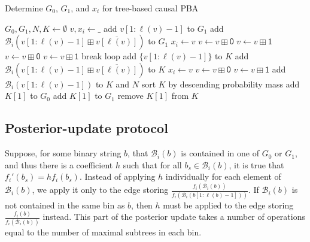 \documentclass{IEEEtran}
\begin{document}
\begin{algorithm}
\caption{Determine $G_0$, $G_1$, and $x_i$ for tree-based causal PBA}
\label{alg:treeg0}
\begin{algorithmic}
\STATE $G_0, G_1,N, K \gets \emptyset $
\STATE $v,x_i \gets \mathsf{\_}$ 
	\STATE add $v[1:\ell(v)-1]$ to $G_1$
	\STATE add
	$\mathcal{B}_i(v[1:\ell(v)-1]\boxplus \overline{v[\ell(v)]})$ to $G_1$
	\STATE $x_i \gets v$
	\ENDIF
	\STATE $v \gets v\boxplus \mathsf{0}$
	\STATE $v \gets v\boxplus\mathsf{1}$
	\ELSE
	\STATE $v \gets v \boxplus\mathsf{0}$
	\ELSE
	\STATE $v \gets v\boxplus\mathsf{1}$
	\ENDIF
	\STATE break loop
	\ENDIF
\ENDWHILE
{}
\STATE add $\{v[1:\ell(v)-1]\}$ to $K$
\STATE add
$\mathcal{B}_i(v[1:\ell(v)-1]\boxplus \overline{v[\ell(v)]})$ to $K$
\STATE $x_i\gets v$
\ENDIF
{}
\STATE $v \gets v\boxplus\mathsf{0}$
\ELSE
\STATE $v \gets v\boxplus\mathsf{1} $
\ENDIF
\ENDFOR
\STATE add $\mathcal{B}_i(v[1:\ell(v)-1])$ to $K$ and $N$
\STATE sort $K$ by descending probability mass
\STATE add $K[1]$ to $G_0$
\ELSE
\STATE add $K[1]$ to $G_1$
\ENDIF
\STATE remove $K[1]$ from $K$
\ENDWHILE
\end{algorithmic}
\end{algorithm}
\subsection{Posterior-update protocol}
\label{ssec:treeposterior}
Suppose, for some binary string $b$, that $\mathcal{B}_i(b)$ is contained
in one of $G_0$ or $G_1$, and thus there is a coefficient $h$ such that
for all $b_s \in \mathcal{B}_i(b)$, it is true that $f_i'(b_s)=hf_i(b_s)$.
Instead of applying $h$ individually for each element of $\mathcal{B}_i(b)$,
we apply it only to the edge storing $\frac{f_i(\mathcal{B}_i(b))}
{f_i(\mathcal{B}_i(b[1:\ell(b)-1]))}$. If $\mathcal{B}_i(b)$
is not contained in the same bin as $b$, then $h$ must be applied to the edge
storing
$\frac{f_i(b)}{f_i(\mathcal{B}_i(b))}$ instead. This part of the posterior
update takes a number of operations equal to the number of maximal subtrees
in each bin.
\end{document}
